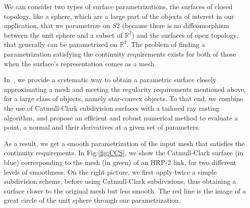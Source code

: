 We can consider two types of surface parametrizations, the surfaces of closed topology, like a sphere, which are a large part of the objects of interest in our application, that we parametrize on $S2$ (because there is no diffeomorphism between the unit sphere and a subset of $\mathbb{R}^2$) and the surfaces of open topology, that generally can be parametrized on $\mathbb{R}^2$.
The problem of finding a parametrization satisfying the continuity requirements exists for both of those when the surface's representation comes as a mesh.

In~\cite{escande:icra:2016}, we provide a systematic way to obtain a parametric surface closely approximating a mesh and meeting the regularity requirements mentioned above, for a large class of objects, namely star-convex objects.
To that end, we combine the use of Catmull-Clark subdivision surfaces with a tailored ray casting algorithm, and propose an efficient and robust numerical method to evaluate a point, a normal and their derivatives at a given set of parameters.

As a result, we get a smooth parametrization of the input mesh that satisfies the continuity requirements.
In Fig:\ref{fig:CCS}, we show the Catmull-Clark surface (in blue) corresponding to the mesh (in green) of an HRP-2 link, for two different levels of smoothness.
On the right picture, we first apply twice a simple subdivision scheme, before using Catmull-Clark subdivisions, thus obtaining a surface closer to the original mesh but less smooth.
The red line is the image of a great circle of the unit sphere through our parametrization.

